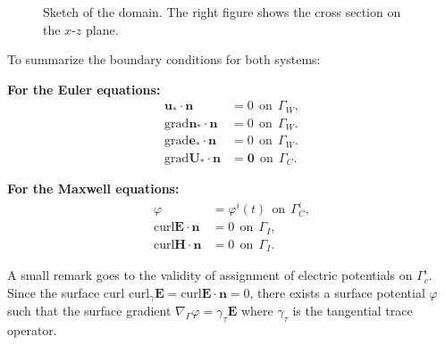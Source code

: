 \documentclass{article}
\begin{document}
\begin{figure}
\begin{minipage}{0.49\textwidth}
{}
\end{minipage}
\caption{Sketch of the domain. The right figure shows the cross section on the $x$-$z$ plane.}
\end{figure}


    To summarize the boundary conditions for both systems:
    
\vspace{10pt}
\begin{minipage}[t]{0.49\textwidth}
    \textbf{For the Euler equations:}
    \begin{align*}
    \mathbf{u_*}\cdot \mathbf{n} &= 0 \ \ \text{on} \ \ \Gamma_W, \\
    \text{grad}\mathbf{n_*} \cdot \mathbf{n} &= 0 \ \ \text{on} \ \ \Gamma_W. \\
    \text{grad}\mathbf{e_*} \cdot \mathbf{n} &= 0 \ \ \text{on} \ \ \Gamma_W. \\
    \text{grad}\mathbf{U_*} \cdot \mathbf{n} &= \mathbf{0} \ \ \text{on} \ \ \Gamma_C.
\end{align*}
\end{minipage}
\begin{minipage}[t]{0.49\textwidth}
    \textbf{For the Maxwell equations:}
    \begin{align*}
    \varphi &= \varphi^i(t)\ \ \text{on} \ \ \Gamma_C^i, \\
    \text{curl} \mathbf{E} \cdot \mathbf{n} &= 0\ \ \text{on} \ \  \Gamma_I,  \\
    \text{curl} \mathbf{H} \cdot \mathbf{n} &= 0\ \  \text{on} \ \  \Gamma_I.\
    \end{align*}
\end{minipage}

\vspace{10pt}
A small remark goes to the validity of assignment of electric potentials on $\Gamma_c^i$. Since the surface curl $\text{curl}_\gamma\mathbf{E} = \text{curl} \mathbf{E} \cdot \mathbf{n} = 0$, there exists a surface potential $\varphi$ such that the surface gradient $\nabla_\Gamma \varphi = \gamma_\tau \mathbf{E}$ where $\gamma_\tau $ is the tangential trace operator. 
\end{document}
